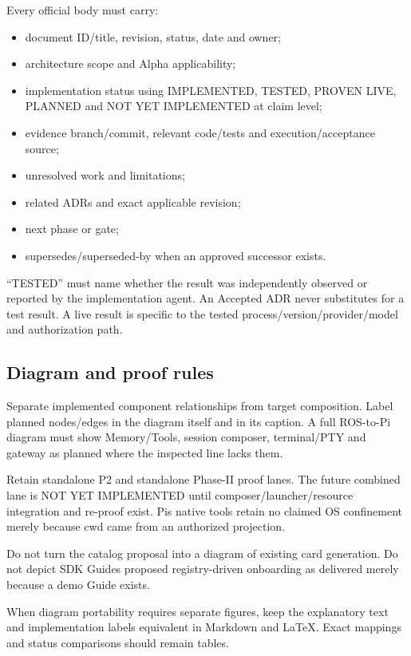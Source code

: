 \documentclass[
  11pt,
]{article}
\providecommand{\tightlist}{%
  \setlength{\itemsep}{0pt}\setlength{\parskip}{0pt}}
\begin{document}
Every official body must carry:

\begin{itemize}
\tightlist
\item
  document ID/title, revision, status, date and owner;
\item
  architecture scope and Alpha applicability;
\item
  implementation status using IMPLEMENTED, TESTED, PROVEN LIVE, PLANNED
  and NOT YET IMPLEMENTED at claim level;
\item
  evidence branch/commit, relevant code/tests and execution/acceptance
  source;
\item
  unresolved work and limitations;
\item
  related ADRs and exact applicable revision;
\item
  next phase or gate;
\item
  supersedes/superseded-by when an approved successor exists.
\end{itemize}

``TESTED'' must name whether the result was independently observed or
reported by the implementation agent. An Accepted ADR never substitutes
for a test result. A live result is specific to the tested
process/version/provider/model and authorization path.

\hypertarget{diagram-and-proof-rules}{%
\subsection{Diagram and proof rules}\label{diagram-and-proof-rules}}

Separate implemented component relationships from target composition.
Label planned nodes/edges in the diagram itself and in its caption. A
full ROS-to-Pi diagram must show Memory/Tools, session composer,
terminal/PTY and gateway as planned where the inspected line lacks them.

Retain standalone P2 and standalone Phase-II proof lanes. The future
combined lane is NOT YET IMPLEMENTED until composer/launcher/resource
integration and re-proof exist. Pi\textquotesingle s native tools retain
no claimed OS confinement merely because cwd came from an authorized
projection.

Do not turn the catalog proposal into a diagram of existing card
generation. Do not depict SDK Guide\textquotesingle s proposed
registry-driven onboarding as delivered merely because a demo Guide
exists.

When diagram portability requires separate figures, keep the explanatory
text and implementation labels equivalent in Markdown and LaTeX. Exact
mappings and status comparisons should remain tables.
\end{document}
